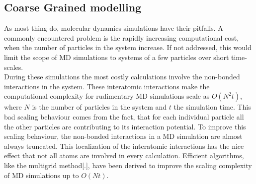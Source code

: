 %

\subsection{Coarse Grained modelling}
As most thing do, molecular dynamics simulations have their pitfalls. A commonly
encountered problem is the rapidly increasing computational cost, when the number of
particles in the system increase. If not addressed, this would limit the scope of MD
simulations to systems of a few particles over short time-scales.\\

During these simulations the most costly calculations involve the non-bonded
interactions in the system. These interatomic interactions make the computational
complexity for rudimentary MD simulations scale as $O(N^2t)$, where $N$ is the number of
particles in the system and $t$ the simulation time. This bad scaling behaviour comes
from the fact, that for each individual particle all the other particles are contributing
to its interaction potential. To improve this scaling behaviour, the non-bonded
interactions in a MD simulation are almost always truncated. This localization of the
interatomic interactions has the nice effect that not all atoms are involved in every
calculation. Efficient algorithms, like the multigrid method[.], have been derived to
improve the scaling complexity of MD simulations up to $O(Nt)$.\\

